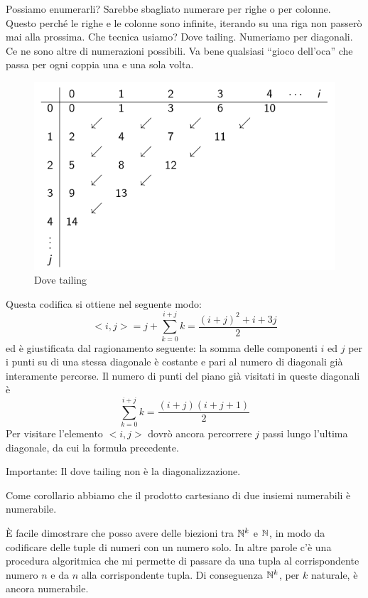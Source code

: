 Possiamo enumerarli? Sarebbe sbagliato numerare per righe o per colonne. Questo perché le righe e
le colonne sono infinite, iterando su una riga non passerò mai alla prossima. Che tecnica usiamo?
Dove tailing. Numeriamo per diagonali. Ce ne sono altre di numerazioni possibili. Va bene qualsiasi
``gioco dell'oca'' che passa per ogni coppia una e una sola volta.

\begin{figure}[h]
    \centering
    \includegraphics[scale=0.5]{./img/numerability/DoveTailing.jpg}
    \caption{Dove tailing}
\end{figure}

Questa codifica si ottiene nel seguente modo:
\begin{equation*}
    <i,j> = j + \sum_{k=0}^{i+j}k = \frac{(i+j)^{2}+i+3j}{2}
\end{equation*}
ed è giustificata dal ragionamento seguente: la somma delle componenti $i$ ed $j$ per i punti su di una
stessa diagonale è costante e pari al numero di diagonali già interamente percorse. Il numero di
punti del piano già visitati in queste diagonali è
\begin{equation*}
    \sum_{k=0}^{i+j}k = \frac{(i+j)(i+j+1)}{2}
\end{equation*}
Per visitare l'elemento $<i,j>$ dovrò ancora percorrere $j$ passi lungo l'ultima diagonale, da cui
la formula precedente.

Importante: Il dove tailing non è la diagonalizzazione.

Come corollario abbiamo che il prodotto cartesiano di due insiemi numerabili è numerabile.

È facile dimostrare che posso avere delle biezioni tra $\mathbb{N}^{k}$ e $\mathbb{N}$, in modo da codificare
delle tuple di numeri con un numero solo. In altre parole c'è una procedura algoritmica che mi
permette di passare da una tupla al corrispondente numero $n$ e da $n$ alla corrispondente tupla. Di
conseguenza $\mathbb{N}^{k}$, per $k$ naturale, è ancora numerabile.

